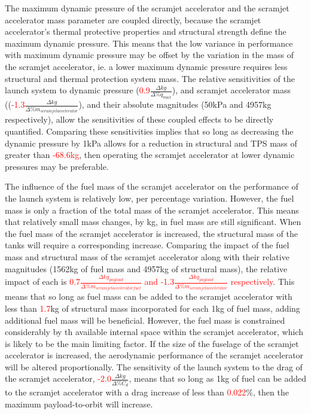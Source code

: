 The maximum dynamic pressure of the scramjet accelerator and the scramjet accelerator mass parameter are coupled directly, because the scramjet accelerator's thermal protective properties and structural strength define the maximum dynamic pressure. This means that the low variance in performance with maximum dynamic pressure may be offset by the variation in the mass of the scramjet accelerator, ie. a lower maximum dynamic pressure requires less structural and thermal protection system mass.
The relative sensitivities of the launch system to dynamic pressure (\textcolor{red}{0.9}$\frac{\Delta kg}{\Delta\%q_{max}}$), and scramjet accelerator mass ((\textcolor{red}{-1.3}$\frac{\Delta kg}{\Delta\%m_{scramjet accelerator}}$), and their absolute magnitudes (50kPa and 4957kg respectively), allow the sensitivities of these coupled effects to be directly quantified. Comparing these sensitivities implies that so long as decreasing the dynamic pressure by 1kPa allows for a reduction in structural and TPS mass of greater than \textcolor{red}{-68.6kg}, then operating the scramjet accelerator at lower dynamic pressures may be preferable. 

The influence of the fuel mass of the scramjet accelerator on the performance of the launch system is relatively low, per percentage variation. However, the fuel mass is only a fraction of the total mass of the scramjet accelerator. This means that relatively small mass changes, by kg, in fuel mass are still significant. 
When the fuel mass of the scramjet accelerator is increased, the structural mass of the tanks will require a corresponding increase. 
Comparing the impact of the fuel mass and structural mass of the scramjet accelerator along with their relative magnitudes (1562kg of fuel mass and 4957kg of structural mass), the relative impact of each is \textcolor{red}{0.7$\frac{\Delta kg_{payload}}{\Delta\%m_{scramjet accelerator fuel}}$ and -1.3$\frac{\Delta kg_{payload}}{\Delta\%m_{scramjet accelerator}}$ respectively}. This means that so long as fuel mass can be added to the scramjet accelerator with less than \textcolor{red}{1.7}kg of structural mass incorporated for each 1kg of fuel mass, adding additional fuel mass will be beneficial. However, the fuel mass is constrained considerably by th available internal space within the scramjet accelerator, which is likely to be the main limiting factor.
If the size of the fuselage of the scramjet accelerator is increased, the aerodynamic performance of the scramjet accelerator will be altered proportionally. 
The sensitivity of the launch system to the drag of the scramjet accelerator, \textcolor{red}{-2.0}$\frac{\Delta kg}{\Delta\%C_{d}}$, means that so long as 1kg of fuel can be added to the scramjet accelerator with a drag increase of less than \textcolor{red}{0.022}\%, then the maximum payload-to-orbit will increase. 


